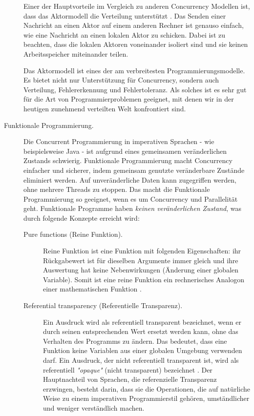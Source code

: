 \begin{description}
	Einer der Hauptvorteile im Vergleich zu anderen Concurrency Modellen ist, dass das Aktormodell die Verteilung unterstützt \cite{Hewitt_artificialintelligence}. Das Senden einer Nachricht an einen Aktor auf einem anderen Rechner ist genauso einfach, wie eine Nachricht an einen lokalen Aktor zu schicken. Dabei ist zu beachten, dass die lokalen Aktoren voneinander isoliert sind und sie keinen Arbeitsspeicher miteinander teilen.
	
	Das Aktormodell ist eines der am verbreitesten Programmierungsmodelle. Es bietet nicht nur Unterstützung für Concurrency, sondern auch Verteilung, Fehlererkennung und Fehlertoleranz. Als solches ist es sehr gut für die Art von Programmierproblemen geeignet, mit denen wir in der heutigen zunehmend verteilten Welt konfrontiert sind.
	
	\item[Funktionale Programmierung.] Die Concurrent Programmierung in imperativen Sprachen - wie beispielsweise Java - ist aufgrund eines gemeinsamen veränderlichen Zustands schwierig. Funktionale Programmierung macht Concurrency einfacher und sicherer, indem gemeinsam genutzte veränderbare Zustände eliminiert werden. Auf unveränderliche Daten kann zugegriffen werden, ohne mehrere Threads zu stoppen. Das macht die Funktionale Programmierung so geeignet, wenn es um Concurrency und Parallelität geht. Funktionale Programme haben \textit{keinen veränderlichen Zustand}, was durch folgende Konzepte erreicht wird:
	
	\begin{description} 
		\item[Pure functions (Reine Funktion).] Reine Funktion ist eine Funktion mit folgenden Eigenschaften: ihr Rückgabewert ist für dieselben Argumente immer gleich und ihre Auswertung hat keine Nebenwirkungen (Änderung einer globalen Variable). Somit ist eine reine Funktion ein rechnerisches Analogon einer mathematischen Funktion \cite{Armstrong93concurrentprogramming}.
		
		\item[Referential transparency (Referentielle Transparenz).] Ein Ausdruck wird als referentiell transparent bezeichnet, wenn er durch seinen entsprechenden Wert ersetzt werden kann, ohne das Verhalten des Programms zu ändern. Das bedeutet, dass eine Funktion keine Variablen aus einer globalen Umgebung verwenden darf. Ein Ausdruck, der nicht referentiell transparent ist, wird als referentiell \textit{"opaque"} (nicht transparent) bezeichnet \cite{Armstrong93concurrentprogramming}. Der Hauptnachteil von Sprachen, die referenzielle Transparenz erzwingen, besteht darin, dass sie die Operationen, die auf natürliche Weise zu einem imperativen Programmierstil gehören, umständlicher und weniger verständlich machen.
	\end{description}
	

\end{description}
